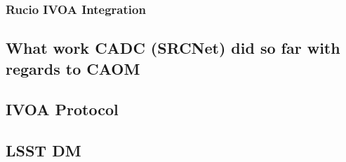 \subsubsection{Rucio IVOA Integration}

\subsection{What work CADC (SRCNet) did so far with regards to CAOM}

\subsection{IVOA Protocol}

\subsection{LSST DM}